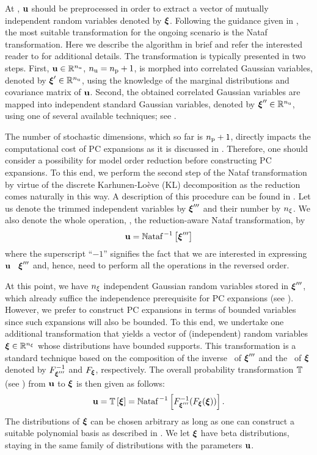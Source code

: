 At , $\mathbf{u}$ should be preprocessed in order to extract a vector of mutually independent random variables denoted by $\boldsymbol{\xi}$.
Following the guidance given in , the most suitable transformation for the ongoing scenario is the Nataf transformation.
Here we describe the algorithm in brief and refer the interested reader to \cite{li2008} for additional details.
The transformation is typically presented in two steps.
First, $\mathbf{u} \in \mathbb{R}^{n_\text{u}}$, ${n_\text{u}} = {n_\text{p}} + 1$, is morphed into correlated Gaussian variables, denoted by $\boldsymbol{\xi}' \in \mathbb{R}^{n_\text{u}}$, using the knowledge of the marginal distributions and covariance matrix of $\mathbf{u}$.
Second, the obtained correlated Gaussian variables are mapped into independent standard Gaussian variables, denoted by $\boldsymbol{\xi}'' \in \mathbb{R}^{n_\text{u}}$, using one of several available techniques; see \cite{li2008}.

The number of stochastic dimensions, which so far is ${n_\text{p}} + 1$, directly impacts the computational cost of PC expansions as it is discussed in .
Therefore, one should consider a possibility for model order reduction before constructing PC expansions.
To this end, we perform the second step of the Nataf transformation by virtue of the discrete Karhunen-Lo\`{e}ve (KL) decomposition \cite{ghanem1991} as the reduction comes naturally in this way.
A description of this procedure can be found in .
Let us denote the trimmed independent variables by $\boldsymbol{\xi}'''$ and their number by ${n_\xi}$.
We also denote the whole operation, \ie, the reduction-aware Nataf transformation, by
\[
  \mathbf{u} = \mathbb{N}\text{ataf}^{\,-1}\left[\boldsymbol{\xi}'''\right]
\]
where the superscript ``$-1$'' signifies the fact that we are interested in expressing $\mathbf{u}$ \via\ $\boldsymbol{\xi}'''$ and, hence, need to perform all the operations in the reversed order.

At this point, we have ${n_\xi}$ independent Gaussian random variables stored in $\boldsymbol{\xi}'''$, which already suffice the independence prerequisite for PC expansions (see ).
However, we prefer to construct PC expansions in terms of bounded variables since such expansions will also be bounded.
To this end, we undertake one additional transformation that yields a vector of (independent) random variables $\boldsymbol{\xi} \in \mathbb{R}^{n_\xi}$ whose distributions have bounded supports.
This transformation is a standard technique based on the composition of the inverse \cdf\ of $\boldsymbol{\xi}'''$ and the \cdf\ of $\boldsymbol{\xi}$ denoted by $F^{-1}_{\boldsymbol{\xi}'''}$ and $F_{\boldsymbol{\xi}}$, respectively.
The overall probability transformation $\oTransform$ (see ) from $\mathbf{u}$ to $\boldsymbol{\xi}$ is then given as follows:
\[
  \vU = \oTransform{\vZ} = \oInvNataf{\fCDF^{-1}_{\vZ'''}(\fCDF_{\vZ}(\vZ))}.
\]
The distributions of $\boldsymbol{\xi}$ can be chosen arbitrary as long as one can construct a suitable polynomial basis as described in .
We let $\boldsymbol{\xi}$ have beta distributions, staying in the same family of distributions with the parameters $\mathbf{u}$.
